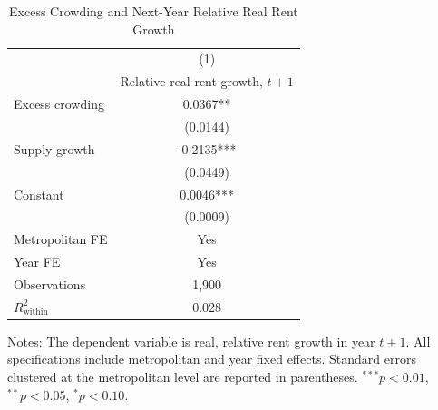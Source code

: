 \begin{table}[htbp]
\centering
\caption{Excess Crowding and Next-Year Relative Real Rent Growth}
\label{tab:regression_residual_summary}
\begin{tabular}{lc}
\toprule
 & (1) \\
 & Relative real rent growth, $t{+}1$ \\
\midrule
Excess crowding          & 0.0367** \\
                         & (0.0144) \\
Supply growth            & -0.2135*** \\
                         & (0.0449) \\
Constant                 & 0.0046*** \\
                         & (0.0009) \\
\midrule
Metropolitan FE          & Yes \\
Year FE                  & Yes \\
Observations             & 1,900 \\
$R^2_{\text{within}}$    & 0.028 \\
\bottomrule
\end{tabular}
\begin{flushleft}
\footnotesize
Notes: The dependent variable is real, relative rent growth in year $t{+}1$.
All specifications include metropolitan and year fixed effects.
Standard errors clustered at the metropolitan level are reported in parentheses.
$^{***}p<0.01$, $^{**}p<0.05$, $^{*}p<0.10$.
\end{flushleft}
\end{table}